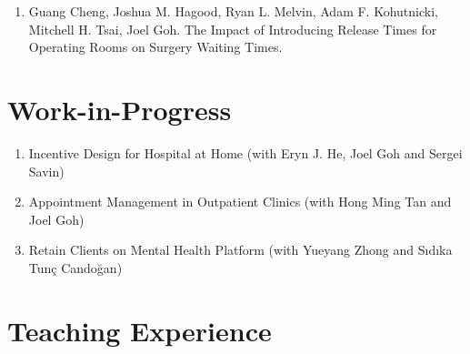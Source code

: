 \documentclass[12pt, a4paper]{article}
\begin{document}
{\begin{enumerate}[leftmargin=30pt, resume]
	\begin{itemize}
		\item {\footnotesize Finalist, 2025 POMS PITM Best Student Paper Competition}
		\item {\footnotesize Select for presentation at Workshop on Empirical Operations Management 2025}
	\end{itemize}

	\item Guang Cheng, Joshua M. Hagood, Ryan L. Melvin, Adam F. Kohutnicki, Mitchell H. Tsai, Joel Goh. The Impact of Introducing Release Times for Operating Rooms on Surgery Waiting Times.

\end{enumerate}




\section*{Work-in-Progress}

\begin{enumerate}[leftmargin=30pt, resume]

	\item Incentive Design for Hospital at Home (with Eryn J. He, Joel Goh and Sergei Savin)
	
	\item Appointment Management in Outpatient Clinics (with Hong Ming Tan and Joel Goh)
	
	\item Retain Clients on Mental Health Platform (with Yueyang Zhong and S\i{}d\i{}ka Tun\c{c} Cando\u{g}an) 
	
\end{enumerate}




\section*{Teaching Experience}
\begin{itemize}


\end{itemize}}
\end{document}
